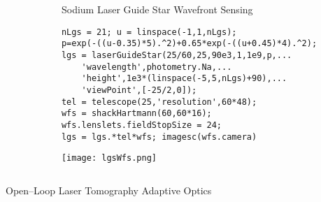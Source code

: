 \documentclass{beamer}
\begin{document}
\begin{frame}[fragile]
\begin{columns}
\begin{column}{0.68\linewidth}
    \end{column}
    \begin{column}{0.31\linewidth}
      \begin{block}{Sodium Laser Guide Star Wavefront Sensing}
\begin{verbatim}
nLgs = 21; u = linspace(-1,1,nLgs);
p=exp(-((u-0.35)*5).^2)+0.65*exp(-((u+0.45)*4).^2);
lgs = laserGuideStar(25/60,25,90e3,1,1e9,p,...
    'wavelength',photometry.Na,...
    'height',1e3*(linspace(-5,5,nLgs)+90),...
    'viewPoint',[-25/2,0]);
tel = telescope(25,'resolution',60*48);
wfs = shackHartmann(60,60*16);
wfs.lenslets.fieldStopSize = 24;
lgs = lgs.*tel*wfs; imagesc(wfs.camera)
\end{verbatim}
        \texttt{[image: lgsWfs.png]}
      \end{block}
    \end{column}
  \end{columns}

  \begin{block}{Open--Loop Laser Tomography Adaptive Optics}

\end{block}
\end{frame}
\end{document}
